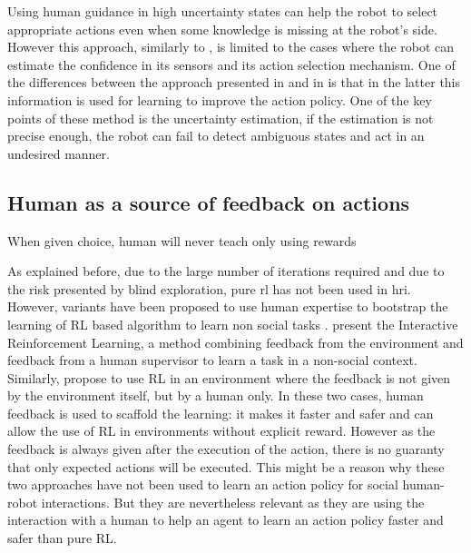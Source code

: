
Using human guidance in high uncertainty states can help the robot to select appropriate actions even when some knowledge is missing at the robot's side. However this approach, similarly to \citet{shiomi2008semi}, is limited to the cases where the robot can estimate the confidence in its sensors and its action selection mechanism. One of the differences between the approach presented in \citet{shiomi2008semi} and in \citet{chernova2009} is that in the latter this information is used for learning to improve the action policy. One of the key points of these method is the uncertainty estimation, if the estimation is not precise enough, the robot can fail to detect ambiguous states and act in an undesired manner. 

\subsection{Human as a source of feedback on actions}
\cite{isbell2006cobot}

When given choice, human will never teach only using rewards \cite{kaochar2011towards} %



As explained before, due to the large number of iterations required and due to the risk presented by blind exploration, pure \gls{rl} has not been used in \gls{hri}. However, variants have been proposed to use human expertise to bootstrap the learning of RL based algorithm to learn non social tasks \citep{kober2013reinforcement}. \citet{thomaz2008teachable} present the Interactive Reinforcement Learning, a method combining feedback from the environment and feedback from a human supervisor to learn a task in a non-social context. Similarly, \citet{knox2009interactively} propose to use RL in an environment where the feedback is not given by the environment itself, but by a human only. In these two cases, human feedback is used to scaffold the learning: it makes it faster and safer and can allow the use of RL in environments without explicit reward. However as the feedback is always given after the execution of the action, there is no guaranty that only expected actions will be executed. This might be a reason why these two approaches have not been used to learn an action policy for social human-robot interactions. But they are nevertheless relevant as they are using the interaction with a human to help an agent to learn an action policy faster and safer than pure RL.



